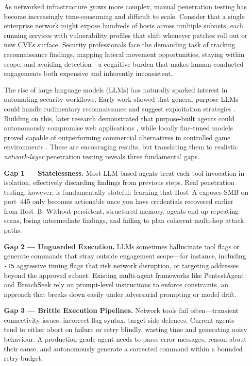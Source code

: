 \documentclass[conference]{IEEEtran}
\begin{document}
As networked infrastructure grows more complex, manual penetration testing has become increasingly time-consuming and difficult to scale. Consider that a single enterprise network might expose hundreds of hosts across multiple subnets, each running services with vulnerability profiles that shift whenever patches roll out or new CVEs surface. Security professionals face the demanding task of tracking reconnaissance findings, mapping lateral movement opportunities, staying within scope, and avoiding detection---a cognitive burden that makes human-conducted engagements both expensive and inherently inconsistent.

The rise of large language models (LLMs) has naturally sparked interest in automating security workflows. Early work showed that general-purpose LLMs could handle rudimentary reconnaissance and suggest exploitation strategies \cite{happe2023pwnd}. Building on this, later research demonstrated that purpose-built agents could autonomously compromise web applications \cite{fang2024hack}, while locally fine-tuned models proved capable of outperforming commercial alternatives in controlled game environments \cite{rigaki2024hackphyr}. These are encouraging results, but translating them to realistic \textit{network-layer} penetration testing reveals three fundamental gaps.

\textbf{Gap 1 --- Statelessness.} Most LLM-based agents treat each tool invocation in isolation, effectively discarding findings from previous steps. Real penetration testing, however, is fundamentally stateful: learning that Host~A exposes SMB on port~445 only becomes actionable once you have credentials recovered earlier from Host~B. Without persistent, structured memory, agents end up repeating scans, losing intermediate findings, and failing to plan coherent multi-hop attack paths.

\textbf{Gap 2 --- Unguarded Execution.} LLMs sometimes hallucinate tool flags or generate commands that stray outside engagement scope---for instance, including \texttt{-T5} aggressive timing flags that risk network disruption, or targeting addresses beyond the approved subnet. Existing multi-agent frameworks like PentestAgent \cite{shen2024pentestagent} and BreachSeek \cite{breachseek2024} rely on prompt-level instructions to enforce constraints, an approach that breaks down easily under adversarial prompting or model drift.

\textbf{Gap 3 --- Brittle Execution Pipelines.} Network tools fail often---transient connectivity issues, incorrect flag syntax, target-side defences. Current agents tend to either abort on failure or retry blindly, wasting time and generating noisy behaviour. A production-grade agent needs to parse error messages, reason about their cause, and autonomously generate a corrected command within a bounded retry budget.
\end{document}
